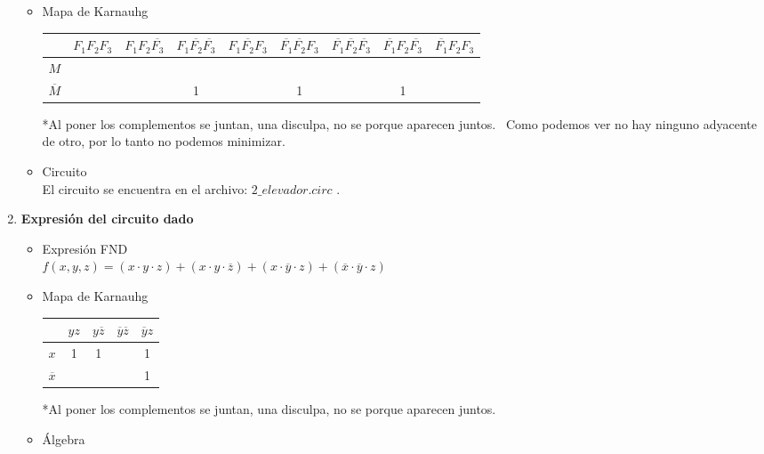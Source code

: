 \documentclass[12pt]{article}
\begin{document}
\begin{enumerate}
\begin{itemize}
  		\item Mapa de Karnauhg \\
  			\begin{table}[h!]
  				\centering
  				\begin{tabular}{|c|c|c|c|c|c|c|c|c|}
  					\hline
  					& $F_1F_2F_3$ & $F_1F_2\overline{F_3}$ & $F_1\overline{F_2}\overline{F_3}$ & $F_1\overline{F_2}F_3$ & $\overline{F_1}\overline{F_2}F_3$ & $\overline{F_1}\overline{F_2}\overline{F_3}$ & $\overline{F_1}F_2\overline{F_3}$ & $\overline{F_1}F_2F_3$ \\ \hline
  					$M$  &        &         &          &         &          &           &          &         \\ \hline
  					$\overline{M}$ &        &         & 1        &         & 1        &           & 1        &         \\ \hline
  				\end{tabular}
  			\end{table}
  			*Al poner los complementos se juntan, una disculpa, no se porque aparecen juntos. \
  			Como podemos ver no hay ninguno adyacente de otro, por lo tanto no podemos minimizar.
  		\item Circuito \\
  			El circuito se encuentra en el archivo: $2\_elevador.circ$ .
  	\end{itemize}
  \item {\bf Expresión del circuito dado}
  	\begin{itemize}
  		\item Expresión FND \\
  			$f(x,y,z) = (x\cdot y\cdot z) + (x\cdot y\cdot \overline{z}) + (x\cdot \overline{y}\cdot z) + (\overline{x}\cdot \overline{y}\cdot z)$
  		\item Mapa de Karnauhg \\
  			\begin{table}[h!]
  				\centering
  				\begin{tabular}{|c|c|c|c|c|}
  					\hline
  					& $yz$ & $y\overline{z}$ & $\overline{y}\overline{z}$ & $\overline{y}z$ \\ \hline
  					$x$  & 1  & 1   &      & 1   \\ \hline
  					$\overline{x}$ &    &     &      & 1   \\ \hline
  				\end{tabular}
  			\end{table}
  			*Al poner los complementos se juntan, una disculpa, no se porque aparecen juntos. \
  		\item Álgebra \\

\end{itemize}
\end{enumerate}
\end{document}
